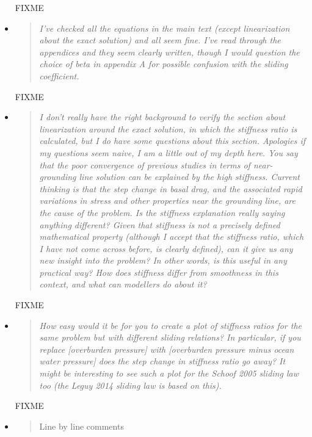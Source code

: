 \documentclass[11pt,reqno]{amsart}
\begin{document}
\begin{itemize}
\noindent FIXME


\item  \begin{quote}
\emph{I've checked all the equations in the main text (except linearization about the exact solution) and all seem fine. I've read through the appendices and they seem clearly written, though I would question the choice of beta in appendix A for possible confusion with the sliding coefficient.}
\end{quote}

\noindent FIXME


\item  \begin{quote}
\emph{I don't really have the right background to verify the section about linearization around the exact solution, in which the stiffness ratio is calculated, but I do have some questions about this section. Apologies if my questions seem naive, I am a little out of my depth here. You say that the poor convergence of previous studies in terms of near-grounding line solution can be explained by the high stiffness. Current thinking is that the step change in basal drag, and the associated rapid variations in stress and other properties near the grounding line, are the cause of the problem. Is the stiffness explanation really saying anything different? Given that stiffness is not a precisely defined mathematical property (although I accept that the stiffness ratio, which I have not come across before, is clearly defined), can it give us any new insight into the problem? In other words, is this useful in any practical way? How does stiffness differ from smoothness in this context, and what can modellers do about it?}
\end{quote}

\noindent FIXME


\item  \begin{quote}
\emph{How easy would it be for you to create a plot of stiffness ratios for the same problem but with different sliding relations? In particular, if you replace [overburden pressure] with [overburden pressure minus ocean water pressure] does the step change in stiffness ratio go away? It might be interesting to see such a plot for the Schoof 2005 sliding law too (the Leguy 2014 sliding law is based on this).}
\end{quote}

\noindent FIXME


\item  \begin{quote}
{
\selectfont
Line by line comments

}
\end{quote}
\end{itemize}
\end{document}
